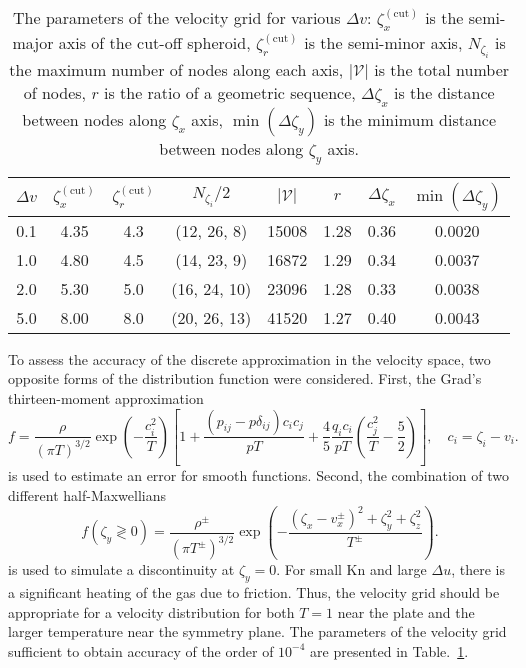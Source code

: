 \documentclass[]{elsarticle} %
\newcommand{\Kn}{\mathrm{Kn}}
\begin{document}
\begin{table}
    \caption{The parameters of the velocity grid for various \(\Delta{v}\):
        \(\zeta^{(\mathrm{cut})}_x\) is the semi-major axis of the cut-off spheroid,
        \(\zeta^{(\mathrm{cut})}_r\) is the semi-minor axis,
        \(N_{\zeta_i}\) is the maximum number of nodes along each axis,
        \(|\mathcal{V}|\) is the total number of nodes,
        \(r\) is the ratio of a geometric sequence,
        \(\Delta\zeta_x\) is the distance between nodes along \(\zeta_x\) axis,
        \(\min(\Delta\zeta_y)\) is the minimum distance between nodes along \(\zeta_y\) axis.}
    \label{table:velocity_grid}
    \centering
    \begin{tabular}{cccccccc}
        \(\Delta{v}\) & \(\zeta^{(\mathrm{cut})}_x\) & \(\zeta^{(\mathrm{cut})}_r\)
            & \(N_{\zeta_i}/2\) & \(|\mathcal{V}|\) & \(r\) & \(\Delta\zeta_x\) & \(\min(\Delta\zeta_y)\) \\\hline
        0.1 & 4.35 & 4.3 & (12, 26, 8)  & 15008 & 1.28 & 0.36 & 0.0020 \\
        1.0 & 4.80 & 4.5 & (14, 23, 9)  & 16872 & 1.29 & 0.34 & 0.0037 \\
        2.0 & 5.30 & 5.0 & (16, 24, 10) & 23096 & 1.28 & 0.33 & 0.0038 \\
        5.0 & 8.00 & 8.0 & (20, 26, 13) & 41520 & 1.27 & 0.40 & 0.0043 \\
    \end{tabular}
\end{table}

To assess the accuracy of the discrete approximation in the velocity space,
two opposite forms of the distribution function were considered.
First, the Grad's thirteen-moment approximation
\begin{equation}\label{eq:grad13}
    f = \frac{\rho}{(\pi T)^{3/2}}\exp\left(-\frac{c_i^2}{ T}\right)
    \left[ 1 + \frac{(p_{ij}-p\delta_{ij})c_ic_j}{pT} + \frac4{5}\frac{q_ic_i}{pT}\left(\frac{c_j^2}{T}-\frac5{2}\right) \right],
    \quad c_i = \zeta_i - v_i.
\end{equation}
is used to estimate an error for smooth functions.
Second, the combination of two different half-Maxwellians
\begin{equation}\label{eq:double_Maxwell}
    f(\zeta_y\gtrless0) = \frac{\rho^\pm}{(\pi T^\pm)^{3/2}}\exp\left(-\frac{(\zeta_x-v_x^\pm)^2+\zeta_y^2+\zeta_z^2}{T^\pm}\right).
\end{equation}
is used to simulate a discontinuity at \(\zeta_y=0\).
For small \(\Kn\) and large \(\Delta{u}\), there is a significant heating of the gas due to friction.
Thus, the velocity grid should be appropriate for a velocity distribution
for both \(T=1\) near the plate and the larger temperature near the symmetry plane.
The parameters of the velocity grid sufficient to obtain accuracy of the order of \(10^{-4}\)
are presented in Table.~\ref{table:velocity_grid}.
\end{document}
